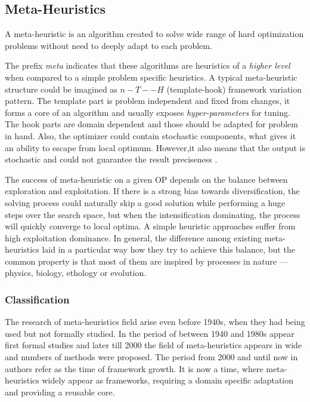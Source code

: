  
\subsection{Meta-Heuristics}
A meta-heuristic is an algorithm created to solve wide range of hard optimization problems without need to deeply adapt to each problem. 


The prefix \textit{meta} indicates that these algorithms are heuristics of a \textit{higher level} when compared to a simple problem specific heuristics. A typical meta-heuristic structure could be imagined as $n-T--H$ (template-hook) framework variation pattern. The template part is problem independent and fixed from changes, it forms a core of an algorithm and usually exposes \textit{hyper-parameters} for tuning. The hook parts are domain dependent and those should be adapted for problem in hand.
Also, the optimizer could contain stochastic components, what gives it an ability to escape from local optimum. However,it also means that the output is stochastic and could not guarantee the result preciseness \cite{boussaid2013survey}.


The success of meta-heuristic on a given OP depends on the balance between exploration and exploitation. If there is a strong bias towards diversification, the solving process could naturally skip a good solution while performing a huge steps over the search space, but when the intensification dominating, the process will quickly converge to local optima. A simple heuristic approaches suffer from high exploitation dominance. 
In general, the difference among existing meta-heuristics laid in a particular way how they try to achieve this balance, but the common property is that most of them are inspired by processes in nature — physics, biology, ethology or evolution.


\subsubsection{Classification}
The research of meta-heuristics field arise even before 1940s, when they had being used but not formally studied. In the period of between 1940 and 1980s appear first formal studies and later till 2000 the field of meta-heuristics appears in wide and numbers of methods were proposed. The period from 2000 and until now in \cite{sorensen2017history} authors refer as the time of framework growth. It is now a time, where meta-heuristics widely appear as frameworks, requiring a domain specific adaptation and providing a reusable core. 

